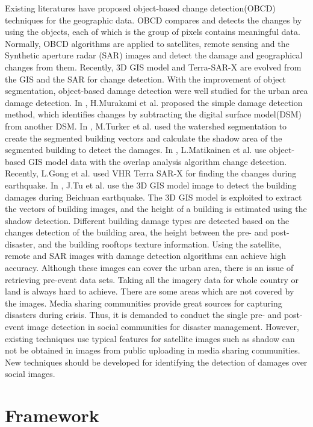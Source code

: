 \documentclass[runningheads,a4paper]{llncs}
\begin{document}
Existing literatures have proposed object-based change detection(OBCD) techniques for the geographic data. OBCD compares and detects the changes by using the objects, each of which is the group of pixels contains meaningful data. Normally, OBCD algorithms are applied to satellites, remote sensing and the Synthetic aperture radar (SAR) images and detect the damage and geographical changes from them. Recently, 3D GIS model and Terra-SAR-X are evolved from the GIS and the SAR for change detection. With the improvement of object segmentation, object-based damage detection were well studied for the urban area damage detection. In \cite{murakami1999change}, H.Murakami et al. proposed the simple damage detection method, which identifies changes by subtracting the digital surface model(DSM) from another DSM. In \cite{turker2008building}, M.Turker et al. used the watershed segmentation to create the segmented building vectors and calculate the shadow area of the segmented building to detect the damages. In \cite{rs2051217}, L.Matikainen et al. use object-based GIS model data with the overlap analysis algorithm change detection. Recently, L.Gong et al.\cite{gong2016earthquake} used VHR Terra SAR-X for finding the changes during earthquake. In \cite{tu2016automatic}, J.Tu et al. use the 3D GIS model image to detect the building damages during Beichuan earthquake. The 3D GIS model is exploited to extract the vectors of building images, and the height of a building is estimated using the shadow detection. Different building damage types are detected based on the changes detection of the building area, the height between the pre- and post-disaster, and the building rooftops texture information. Using the satellite, remote and SAR images with damage detection algorithms can achieve high accuracy. Although these images can cover the urban area, there is an issue of retrieving pre-event data sets. Taking all the imagery data for whole country or land is always hard to achieve. There are some areas which are not covered by the images. Media sharing communities provide great sources for capturing disasters during crisis. Thus, it is demanded to conduct the single pre- and post-event image detection in social communities for disaster management. However, existing techniques use typical features for satellite images such as shadow can not be obtained in images from public uploading in media sharing communities. New techniques should be developed for identifying the detection of damages over social images.


\section{Framework}\label{sec-framework}
\end{document}
